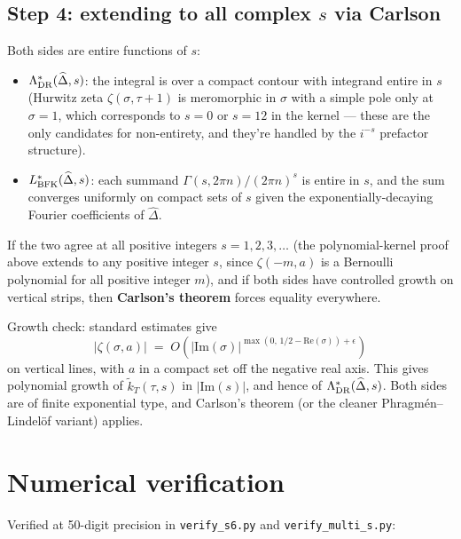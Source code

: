 \documentclass[11pt]{article}
\newcommand{\re}{\mathrm{Re}}
\newcommand{\im}{\mathrm{Im}}
\newcommand{\hatDelta}{\widehat{\Delta}}
\begin{document}
\subsection*{Step 4: extending to all complex $s$ via Carlson}

Both sides are entire functions of $s$:
\begin{itemize}
\item $\Lambda^*_{\rm DR}(\hatDelta, s)$: the integral is over a compact contour with integrand entire in $s$ (Hurwitz zeta $\zeta(\sigma, \tau+1)$ is meromorphic in $\sigma$ with a simple pole only at $\sigma = 1$, which corresponds to $s = 0$ or $s = 12$ in the kernel --- these are the only candidates for non-entirety, and they're handled by the $i^{-s}$ prefactor structure).
\item $L^*_{\rm BFK}(\hatDelta, s)$: each summand $\Gamma(s, 2\pi n)/(2\pi n)^s$ is entire in $s$, and the sum converges uniformly on compact sets of $s$ given the exponentially-decaying Fourier coefficients of $\hatDelta$.
\end{itemize}

If the two agree at all positive integers $s = 1, 2, 3, \dots$ (the polynomial-kernel proof above extends to any positive integer $s$, since $\zeta(-m, a)$ is a Bernoulli polynomial for all positive integer $m$), and if both sides have controlled growth on vertical strips, then \textbf{Carlson's theorem} forces equality everywhere.

Growth check: standard estimates give
\[
|\zeta(\sigma, a)| \;=\; O\!\left(|\im(\sigma)|^{\max(0,\, 1/2 - \re(\sigma)) + \epsilon}\right)
\]
on vertical lines, with $a$ in a compact set off the negative real axis. This gives polynomial growth of $\widetilde{k}_T(\tau, s)$ in $|\im(s)|$, and hence of $\Lambda^*_{\rm DR}(\hatDelta, s)$. Both sides are of finite exponential type, and Carlson's theorem (or the cleaner Phragm\'en--Lindel\"of variant) applies.

\section{Numerical verification}

Verified at 50-digit precision in \texttt{verify\_s6.py} and \texttt{verify\_multi\_s.py}:
\end{document}
